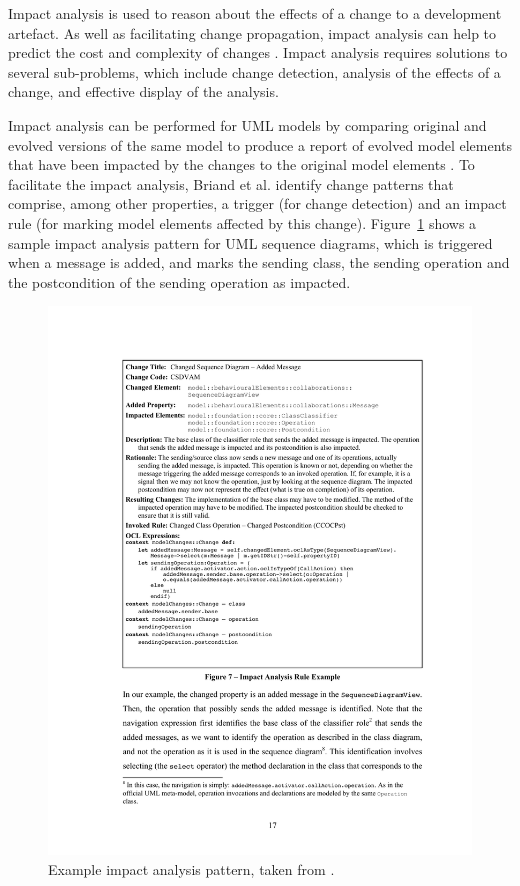 Impact analysis is used to reason about the effects of a change to a development artefact. As well as facilitating change propagation, impact analysis can help to predict the cost and complexity of changes \cite{bohner02impactanalysis}. Impact analysis requires solutions to several sub-problems, which include change detection, analysis of the effects of a change, and effective display of the analysis.

Impact \cc analysis can be performed for UML models by comparing original and evolved versions of the same model to produce a report of evolved model elements that have been impacted by the changes to the original model elements \cite{briand03impactanalysis}. To facilitate the impact analysis, Briand \cc et al. identify change patterns that comprise, among other properties, a trigger (for change detection) and an impact rule (for marking model elements affected by this change). Figure~\ref{fig:impact_analysis_pattern} shows a sample impact analysis pattern for UML sequence diagrams, which is triggered when a message is added, and marks the sending class, the sending operation and the postcondition of the sending operation as impacted.

\begin{figure}[htbp]
  \begin{center}
    \leavevmode
    \includegraphics[width=12cm]{3.LiteratureReview/images/impact_analysis_pattern.pdf}
  \end{center}
  \caption[Example impact analysis pattern]{Example impact analysis pattern, taken from \cite{briand03impactanalysis}.}
  \label{fig:impact_analysis_pattern}
\end{figure}

